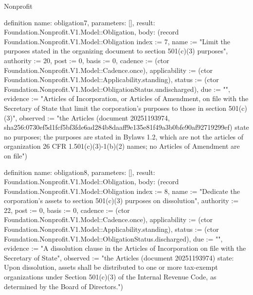 \begin{lexlean}{Nonprofit}
\begin{semanticmodule}
definition{
  name: obligation7,
  parameters: [],
  result: Foundation.Nonprofit.V1.Model::Obligation,
  body: (record Foundation.Nonprofit.V1.Model::Obligation {index := 7, name := "Limit the purposes stated in the organizing document to section 501(c)(3) purposes", authority := 20, post := 0, basis := 0, cadence := (ctor Foundation.Nonprofit.V1.Model::Cadence.once), applicability := (ctor Foundation.Nonprofit.V1.Model::Applicability.standing), status := (ctor Foundation.Nonprofit.V1.Model::ObligationStatus.undischarged), due := "", evidence := "Articles of Incorporation, or Articles of Amendment, on file with the Secretary of State that limit the corporation's purposes to those in section 501(c)(3)", observed := "the Articles (document 20251193974, sha256:0730ef5d1fcf5bf3fde6ad284b8daaff9e135e81f49a3b0bfe90af92719299ef) state no purposes; the purposes are stated in Bylaws 1.2, which are not the articles of organization 26 CFR 1.501(c)(3)-1(b)(2) names; no Articles of Amendment are on file"})
}

definition{
  name: obligation8,
  parameters: [],
  result: Foundation.Nonprofit.V1.Model::Obligation,
  body: (record Foundation.Nonprofit.V1.Model::Obligation {index := 8, name := "Dedicate the corporation's assets to section 501(c)(3) purposes on dissolution", authority := 22, post := 0, basis := 0, cadence := (ctor Foundation.Nonprofit.V1.Model::Cadence.once), applicability := (ctor Foundation.Nonprofit.V1.Model::Applicability.standing), status := (ctor Foundation.Nonprofit.V1.Model::ObligationStatus.discharged), due := "", evidence := "A dissolution clause in the Articles of Incorporation on file with the Secretary of State", observed := "the Articles (document 20251193974) state: Upon dissolution, assets shall be distributed to one or more tax-exempt organizations under Section 501(c)(3) of the Internal Revenue Code, as determined by the Board of Directors."})
}


\end{semanticmodule}
\end{lexlean}
